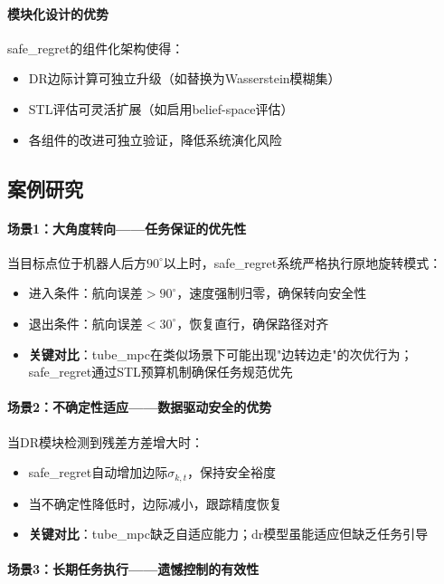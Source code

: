 \documentclass[12pt,a4paper]{ctexart}
\numberwithin{equation}{section}
\begin{document}
\paragraph*{模块化设计的优势}

safe\_regret的组件化架构使得：
\begin{itemize}
    \item DR边际计算可独立升级（如替换为Wasserstein模糊集）
    \item STL评估可灵活扩展（如启用belief-space评估）
    \item 各组件的改进可独立验证，降低系统演化风险
\end{itemize}

\subsection{案例研究}

\paragraph*{场景1：大角度转向——任务保证的优先性}

当目标点位于机器人后方$90^\circ$以上时，safe\_regret系统严格执行原地旋转模式：
\begin{itemize}
    \item 进入条件：航向误差$> 90^\circ$，速度强制归零，确保转向安全性
    \item 退出条件：航向误差$< 30^\circ$，恢复直行，确保路径对齐
    \item \textbf{关键对比}：tube\_mpc在类似场景下可能出现"边转边走"的次优行为；safe\_regret通过STL预算机制确保任务规范优先
\end{itemize}

\paragraph*{场景2：不确定性适应——数据驱动安全的优势}

当DR模块检测到残差方差增大时：
\begin{itemize}
    \item safe\_regret自动增加边际$\sigma_{k,t}$，保持安全裕度
    \item 当不确定性降低时，边际减小，跟踪精度恢复
    \item \textbf{关键对比}：tube\_mpc缺乏自适应能力；dr模型虽能适应但缺乏任务引导
\end{itemize}

\paragraph*{场景3：长期任务执行——遗憾控制的有效性}
\end{document}

